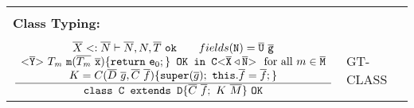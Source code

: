 {\begin{minipage}{\textwidth}
\begin{tabular}{l l}
  & \\

\textbf{Class Typing:} & \\
& \\
  $\frac{\displaystyle 
    \begin{array}{c}
      \overline{X} <: \overline{N} \vdash \overline{N}, N, \overline{T}\ \texttt{ok}
      \quad\quad fields(\mathtt{N}) = \overline{\mathtt{U}} \ \overline{\mathtt{g}}\\
      \mathtt{ {\tt <} \overline{Y} {\tt >} \ } T_\mathit{m}\ \texttt{m}(\overline{T_\mathit{m}}\ \overline{\mathtt{x}}) \{\texttt{return}\ \mathtt{e}_0;\}
  \texttt{ OK in }\mathtt{C {\tt <} \overline{X} \triangleleft \overline{N} {\tt >} \ }  \textrm{ for all } m
      \in \overline{\mathtt{M}}\\
    K = C(\overline{D} \ \overline{g}, \overline{C} \ \overline{f}) \{ \texttt{super}(\overline{g}); \ \texttt{this}.\overline{f}=\overline{f}; \} \\
  \end{array}
    }{\displaystyle \texttt{class C extends D}\{ \overline{C} \ \overline{f}; \ K \ \overline{M} \} \ \texttt{OK}}
  $ & GT-CLASS
\end{tabular}
\end{minipage}
}



